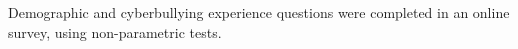 Demographic and cyberbullying experience questions were completed in an online survey, using non-parametric tests.